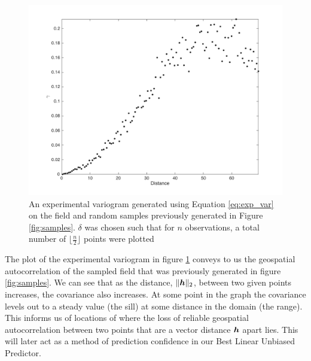 \documentclass[11pt]{ucthesis}
\newcommand{\vect}[1]{{\it{\boldsymbol{#1}}}}
\begin{document}
\begin{figure}[H]
    \centering    
    \includegraphics[width=\linewidth]{figures/exp_variogram.png}
    \captionsetup{skip=0.5\baselineskip,size=footnotesize}
    \caption{An experimental variogram generated using Equation \ref{eq:exp_var} on the field and random samples previously generated in Figure \ref{fig:samples}. $\delta$ was chosen such that for $n$ observations, a total number of $\Big\lfloor \frac{n}{2} \Big\rfloor$ points were plotted}
    \label{fig:exp_var}
\end{figure}

The plot of the experimental variogram in figure \ref{fig:exp_var} conveys to us the geospatial autocorrelation of the sampled field that was previously generated in figure \ref{fig:samples}. We can see that as the distance, $\|\vect{h}\|_2$, between two given points increases, the covariance also increases. At some point in the graph the covariance levels out to a steady value (the sill) at some distance in the domain (the range). This informs us of locations of where the loss of reliable geospatial autocorrelation between two points that are a vector distance $\vect{h}$ apart lies. This will later act as a method of prediction confidence in our Best Linear Unbiased Predictor.
\end{document}
